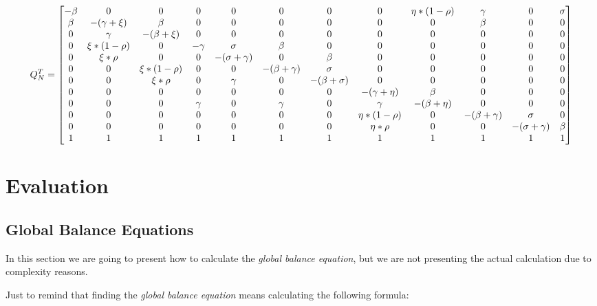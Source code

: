 \documentclass{article}
\begin{document}
{   
\fontsize{3pt}{8pt}\selectfont 
\[Q^{T}_{N} =
\setcounter{MaxMatrixCols}{12}
\begin{bmatrix}
    -\beta & 0 & 0 & 0 & 0 & 0 & 0 & 0 & \eta * (1 - \rho) & \gamma & 0 & \sigma \\
    \beta & -(\gamma + \xi) & \beta & 0 & 0 & 0 & 0 & 0 & 0 & \beta & 0 & 0 \\
    0 & \gamma & -(\beta + \xi) & 0 & 0 & 0 & 0 & 0 & 0 & 0 & 0 & 0 \\
    0 & \xi * (1 - \rho) & 0 & -\gamma & \sigma & \beta & 0 & 0 & 0 & 0 & 0 & 0 \\
    0 & \xi * \rho & 0 & 0 & -(\sigma + \gamma) & 0 & \beta & 0 & 0 & 0 & 0 & 0 \\
    0 & 0 & \xi * (1 - \rho) & 0 & 0 & -(\beta + \gamma) & \sigma & 0 & 0 & 0 & 0 & 0 \\
    0 & 0 & \xi * \rho & 0 & \gamma & 0 & -(\beta + \sigma) & 0 & 0 & 0 & 0 & 0 \\
    0 & 0 & 0 & 0 & 0 & 0 & 0 & -(\gamma + \eta) & \beta & 0 & 0 & 0 \\
    0 & 0 & 0 & \gamma & 0 & \gamma & 0 & \gamma & -(\beta + \eta) & 0 & 0 & 0 \\
    0 & 0 & 0 & 0 & 0 & 0 & 0 & \eta * (1 - \rho) & 0 & -(\beta + \gamma) & \sigma & 0 \\
    0 & 0 & 0 & 0 & 0 & 0 & 0 & \eta * \rho & 0 & 0 & -(\sigma + \gamma) & \beta \\
    1 & 1 & 1 & 1 & 1 & 1 & 1 & 1 & 1 & 1 & 1 & 1 \\
\end{bmatrix}\]
}

\section{Evaluation}

\subsection{Global Balance Equations}

In this section we are going to present how to calculate the \textit{global balance equation}, but we are not presenting the actual calculation due to complexity reasons.\newline

\par\noindent Just to remind that finding the \textit{global balance equation} means calculating the following formula:
\end{document}
